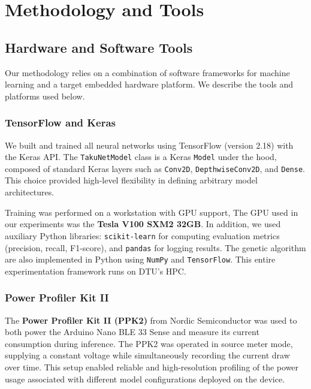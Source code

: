 \chapter{Methodology and Tools}
\label{chap:Methodology}




\section{Hardware and Software Tools}

Our methodology relies on a combination of software frameworks for machine learning and a target embedded hardware platform. We describe the tools and platforms used below.

\subsection*{TensorFlow and Keras}

We built and trained all neural networks using TensorFlow (version 2.18) with the Keras API. The \texttt{TakuNetModel} class is a Keras \texttt{Model} under the hood, composed of standard Keras layers such as \texttt{Conv2D}, \texttt{DepthwiseConv2D}, and \texttt{Dense}. This choice provided high-level flexibility in defining arbitrary model architectures.

Training was performed on a workstation with GPU support, The GPU used in our experiments was the \textbf{Tesla V100 SXM2 32GB}.
In addition, we used auxiliary Python libraries: \texttt{scikit-learn} for computing evaluation metrics (precision, recall, F1-score), and \texttt{pandas} for logging results. The genetic algorithm are also implemented in Python using \texttt{NumPy} and \texttt{TensorFlow}. This entire experimentation framework runs on DTU's HPC.

\subsection*{Power Profiler Kit II}

The \textbf{Power Profiler Kit II (PPK2)} from Nordic Semiconductor was used to both power the Arduino Nano BLE 33 Sense and measure its current consumption during inference. The PPK2 was operated in source meter mode, supplying a constant voltage while simultaneously recording the current draw over time. This setup enabled reliable and high-resolution profiling of the power usage associated with different model configurations deployed on the device.

